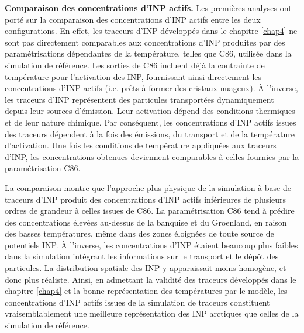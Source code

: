 \medskip
\noindent
\textbf{Comparaison des concentrations d’INP actifs.}  
Les premières analyses ont porté sur la comparaison des concentrations d’INP actifs entre les deux configurations.  
En effet, les traceurs d’INP développés dans le chapitre \ref{chap4} ne sont pas directement comparables aux concentrations d’INP produites par des paramétrisations dépendantes de la température, telles que C86, utilisée dans la simulation de référence.  
Les sorties de C86 incluent déjà la contrainte de température pour l’activation des INP, fournissant ainsi directement les concentrations d’INP actifs (i.e. prêts à former des cristaux nuageux).  
À l’inverse, les traceurs d’INP représentent des particules transportées dynamiquement depuis leur sources d'émission. Leur activation dépend des conditions thermiques et de leur nature chimique.  
Par conséquent, les concentrations d’INP actifs issues des traceurs dépendent à la fois des émissions, du transport et de la température d’activation.  
Une fois les conditions de température appliquées aux traceurs d’INP, les concentrations obtenues deviennent comparables à celles fournies par la paramétrisation C86.  

La comparaison montre que l’approche plus physique de la simulation à base de traceurs d’INP produit des concentrations d’INP actifs inférieures de plusieurs ordres de grandeur à celles issues de C86.  
La paramétrisation C86 tend à prédire des concentrations élevées au-dessus de la banquise et du Groenland, en raison des basses températures, même dans des zones éloignées de toute source de potentiels INP.  
À l’inverse, les concentrations d’INP étaient beaucoup plus faibles dans la simulation intégrant les informations sur le transport et le dépôt des particules.  
La distribution spatiale des INP y apparaissait moins homogène, et donc plus réaliste.  
Ainsi, en admettant la validité des traceurs développés dans le chapitre \ref{chap4} et la bonne représentation des températures par le modèle, les concentrations d’INP actifs issues de la simulation de traceurs constituent vraisemblablement une meilleure représentation des INP arctiques que celles de la simulation de référence.

